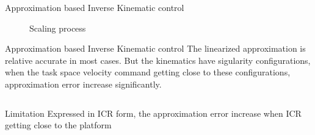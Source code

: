 \documentclass[10pt]{beamer}
\begin{document}

\begin{frame}{Approximation based Inverse Kinematic control}
  \begin{figure}
    \begin{center}
    \resizebox{7cm}{!}
      {
      }
    \end{center}
    \caption{Scaling process}
  \end{figure}
\end{frame}


\begin{frame}{Approximation based Inverse Kinematic control}
The linearized approximation is relative accurate in most cases. But the kinematics have sigularity configurations, when 
the task space velocity command getting close to these configurations, approximation error increase significantly.
\begin{columns}
  \begin{block}{Limitation}
  Expressed in ICR form, the approximation error increase when ICR getting close to the platform
  \end{block}

\end{columns}

\end{frame}
\end{document}
